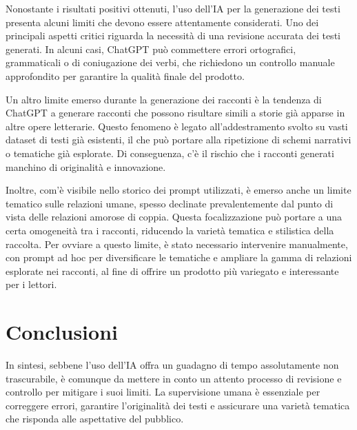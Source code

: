 \documentclass[a4paper,12pt]{article}
\begin{document}
\bigbreak

Nonostante i risultati positivi ottenuti, l'uso dell'IA per la generazione dei testi presenta alcuni limiti che devono essere attentamente considerati. Uno dei principali aspetti critici riguarda la necessità di una revisione accurata dei testi generati. In alcuni casi, ChatGPT può commettere errori ortografici, grammaticali o di coniugazione dei verbi, che richiedono un controllo manuale approfondito per garantire la qualità finale del prodotto.

\bigbreak

Un altro limite emerso durante la generazione dei racconti è la tendenza di ChatGPT a generare racconti che possono risultare simili a storie già apparse in altre opere letterarie. Questo fenomeno è legato all'addestramento svolto su vasti dataset di testi già esistenti, il che può portare alla ripetizione di schemi narrativi o tematiche già esplorate. Di conseguenza, c'è il rischio che i racconti generati manchino di originalità e innovazione.

\bigbreak

Inoltre, com'è visibile nello storico dei prompt utilizzati, è emerso anche un limite tematico sulle relazioni umane, spesso declinate prevalentemente dal punto di vista delle relazioni amorose di coppia. Questa focalizzazione può portare a una certa omogeneità tra i racconti, riducendo la varietà tematica e stilistica della raccolta. Per ovviare a questo limite, è stato necessario intervenire manualmente, con prompt ad hoc per diversificare le tematiche e ampliare la gamma di relazioni esplorate nei racconti, al fine di offrire un prodotto più variegato e interessante per i lettori.


\section*{Conclusioni}

In sintesi, sebbene l'uso dell'IA offra un guadagno di tempo assolutamente non trascurabile, è comunque da mettere in conto un attento processo di revisione e controllo per mitigare i suoi limiti. La supervisione umana è essenziale per correggere errori, garantire l'originalità dei testi e assicurare una varietà tematica che risponda alle aspettative del pubblico.
\end{document}

